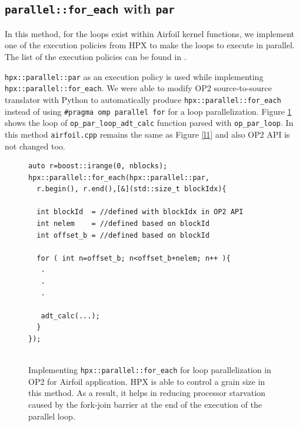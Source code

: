 \documentclass[conference]{IEEEtran}
\begin{document}
\subsection{\texttt{parallel::for\_each} with \texttt{par}}
\label{sec:for}

In this method, for the loops exist within Airfoil kernel functions, we implement one of the execution policies from HPX to make the loops to execute in parallel. The list of the execution policies can be found in \cite{hpx_v0.9.11}. 

\texttt{hpx::parallel::par} as an execution policy is used while implementing \texttt{hpx::parallel::for\_each}. We were able to modify OP2 source-to-source translator with Python to automatically produce \texttt{hpx::parallel::for\_each} instead of using \texttt{\#pragma omp parallel for} for a loop parallelization. Figure \ref{l3} shows the loop of \texttt{op\_par\_loop\_adt\_calc} function parsed with \texttt{op\_par\_loop}. In this method \texttt{airfoil.cpp} remains the same as Figure \ref{l1} and also OP2 API is not changed too.

\begin{figure} 
    \begin{lstlisting}    
auto r=boost::irange(0, nblocks);
hpx::parallel::for_each(hpx::parallel::par,
  r.begin(), r.end(),[&](std::size_t blockIdx){
  
  int blockId  = //defined with blockIdx in OP2 API
  int nelem    = //defined based on blockId 
  int offset_b = //defined based on blockId
        
  for ( int n=offset_b; n<offset_b+nelem; n++ ){
   .
   .
   .

   adt_calc(...);
  }
});
  
    \end{lstlisting}
    \caption{\small{Implementing \texttt{hpx::parallel::for\_each} for loop parallelization in OP2 for Airfoil application. HPX is able to control a grain size in this method. As a result, it helps in reducing processor starvation caused by the fork-join barrier at the end of the execution of the parallel loop.}}
    \label{l3}
\end{figure}
\end{document}
